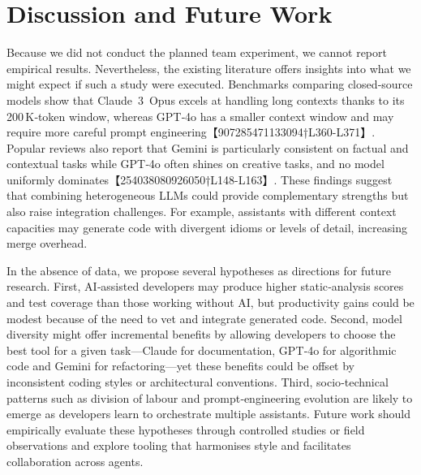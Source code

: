 \documentclass[conference]{IEEEtran}
\begin{document}
\fi

\section{Discussion and Future Work}
Because we did not conduct the planned team experiment, we cannot report empirical results.  Nevertheless, the existing literature offers insights into what we might expect if such a study were executed.  Benchmarks comparing closed‑source models show that Claude 3 Opus excels at handling long contexts thanks to its 200\,K‑token window, whereas GPT‑4o has a smaller context window and may require more careful prompt engineering【907285471133094†L360-L371】.  Popular reviews also report that Gemini is particularly consistent on factual and contextual tasks while GPT‑4o often shines on creative tasks, and no model uniformly dominates【254038080926050†L148-L163】.  These findings suggest that combining heterogeneous LLMs could provide complementary strengths but also raise integration challenges.  For example, assistants with different context capacities may generate code with divergent idioms or levels of detail, increasing merge overhead.

In the absence of data, we propose several hypotheses as directions for future research.  First, AI‑assisted developers may produce higher static‑analysis scores and test coverage than those working without AI, but productivity gains could be modest because of the need to vet and integrate generated code.  Second, model diversity might offer incremental benefits by allowing developers to choose the best tool for a given task—Claude for documentation, GPT‑4o for algorithmic code and Gemini for refactoring—yet these benefits could be offset by inconsistent coding styles or architectural conventions.  Third, socio‑technical patterns such as division of labour and prompt‑engineering evolution are likely to emerge as developers learn to orchestrate multiple assistants.  Future work should empirically evaluate these hypotheses through controlled studies or field observations and explore tooling that harmonises style and facilitates collaboration across agents.
\end{document}

